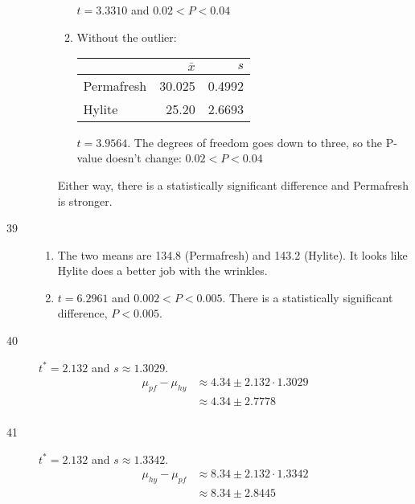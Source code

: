 \documentclass[letterpaper, landscape]{exam}
\begin{document}
\begin{description}
\begin{enumerate}[label = {(\alph*)}]
\begin{enumerate}[label = {(\roman*)}]
                $t = 3.3310$ and $0.02 < P < 0.04$

              \item Without the outlier:

                \begin{tabular}[ht]{lrr}
                  \toprule
                              & $\bar{x}$ & $s$ \\
                  \midrule
                  Permafresh  & 30.025    & 0.4992 \\
                  Hylite      & 25.20     & 2.6693 \\
                  \bottomrule
                \end{tabular}

                $t = 3.9564$. The degrees of freedom goes down to three, so the
                P-value doesn't change: $0.02 < P < 0.04$

            \end{enumerate}

            Either way, there is a statistically significant difference and
            Permafresh is stronger.
        \end{enumerate}

        \item[39]
          \begin{enumerate}[label = {(\alph*)}]
            \item The two means are 134.8 (Permafresh) and 143.2 (Hylite). It
              looks like Hylite does a better job with the wrinkles.

            \item $t = 6.2961$ and $0.002 < P < 0.005$. There is a
              statistically significant difference, $P < 0.005$.

          \end{enumerate}

        \item[40]
          $t^* = 2.132$ and $s \approx 1.3029$.
          \begin{align*}
            \mu_{pf} - \mu_{hy} & \approx 4.34 \pm 2.132 \cdot 1.3029 \\
                                & \approx \boxed{ 4.34 \pm 2.7778 } \\
          \end{align*}

        \item[41]
          $t^* = 2.132$ and $s \approx 1.3342$.
          \begin{align*}
            \mu_{hy} - \mu_{pf} & \approx 8.34 \pm 2.132 \cdot 1.3342 \\
                                & \approx \boxed{ 8.34 \pm 2.8445 } \\
          \end{align*}


  \end{description}
\end{document}
